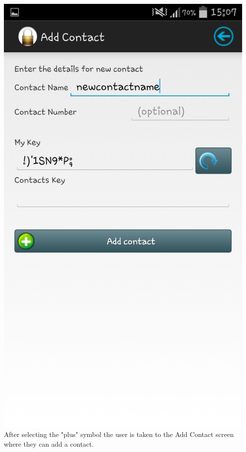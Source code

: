 \begin{center}
 \includegraphics[width=13cm]{screenshots/normal/4_AddContact.png}
\textbf{\\}
 After selecting the "plus" symbol the user is taken to the Add Contact screen where they can add a contact.
\end{center}
